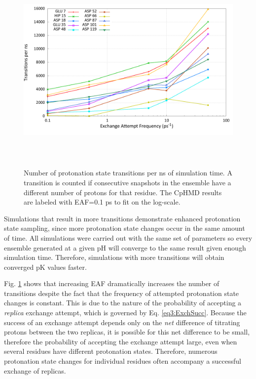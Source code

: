 \begin{figure}
 \includegraphics[width=6.5in, height=4.06in]{transitions.png}
 \caption[Number of protonation state transitions per ns of simulation time.]
         {Number of protonation state transitions per ns of simulation time. A
          transition is counted if consecutive snapshots in the ensemble have a
          different number of protons for that residue. The CpHMD results are
          labeled with EAF=0.1 ps to fit on the log-scale.}
 \label{fig3:transitions}
\end{figure}

Simulations that result in more transitions demonstrate enhanced protonation
state sampling, since more protonation state changes occur in the same amount of
time.  All simulations were carried out with the same set of parameters so every
ensemble generated at a given pH will converge to the same result given enough
simulation time.  Therefore, simulations with more transitions will obtain
converged pK values faster.

Fig. \ref{fig3:transitions} shows that increasing EAF dramatically increases the
number of transitions despite the fact that the frequency of attempted
protonation state changes is constant. This is due to the nature of the
probability of accepting a \emph{replica} exchange attempt, which is governed by
Eq. \ref{eq3:ExchSucc}. Because the success of an exchange attempt depends only
on the \emph{net} difference of titrating protons between the two replicas, it
is possible for this net difference to be small, therefore the probability of
accepting the exchange attempt large, even when several residues have different
protonation  states.  Therefore, numerous protonation state changes for
individual residues often accompany a successful exchange of replicas.

